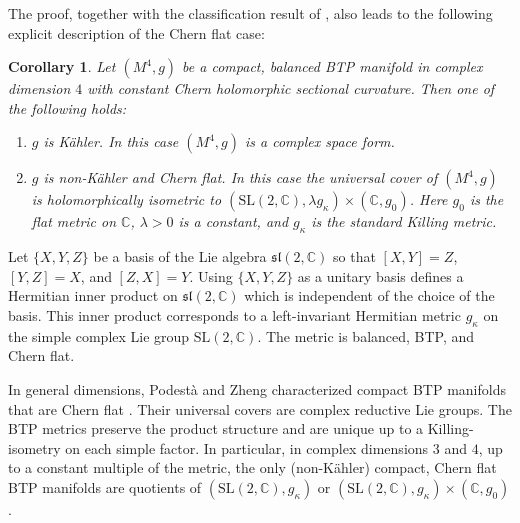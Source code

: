 \documentclass{amsart}
\newtheorem{corollary}[theorem]{Corollary}
\begin{document}
The proof, together with the classification result of \cite{ZhaoZ25}, also leads to the following explicit description of the Chern flat case:

\begin{corollary}
Let $(M^4,g)$ be a compact, balanced BTP manifold in complex dimension $4$ with constant Chern holomorphic sectional curvature. Then one of the following holds:
\begin{enumerate}
\item  $g$ is K\"ahler. In this case $(M^4,g)$ is a complex space form.
\item  $g$ is non-K\"ahler and Chern flat. In this case the universal cover of $(M^4,g)$ is holomorphically isometric to $(\mbox{SL}(2,{\mathbb C}), \lambda g_{\kappa}) \times ({\mathbb C},g_0)$. Here $g_0$ is the flat metric on ${\mathbb C}$, $\lambda >0$ is a constant, and $g_{\kappa}$ is the standard Killing metric.
    \end{enumerate}
\end{corollary}

Let $\{ X, Y, Z\}$ be a basis of the Lie algebra ${\mathfrak s}{\mathfrak l}(2,{\mathbb C})$ so that $[X,Y]=Z$, $[Y,Z]=X$, and $[Z,X]=Y$. Using $\{ X,Y,Z\}$ as a unitary basis defines a Hermitian inner product on ${\mathfrak s}{\mathfrak l}(2,{\mathbb C})$ which is independent of the choice of the basis. This inner product corresponds to a left-invariant Hermitian metric $g_{\kappa}$ on the simple complex Lie group $\mbox{SL}(2,{\mathbb C})$. The metric is balanced, BTP, and  Chern flat.

In general dimensions, Podest\`a and Zheng characterized compact BTP manifolds that are Chern flat \cite[Theorem 1.2, Theorem 3.4]{PodestaZ}. Their universal covers are complex reductive Lie groups. The BTP metrics preserve the product structure and are unique up to a Killing-isometry on each simple factor. In particular, in complex dimensions $3$ and $4$, up to a constant multiple of the metric, the only (non-K\"ahler) compact, Chern flat BTP manifolds are quotients of $(\mbox{SL}(2,{\mathbb C}), g_{\kappa})$ or $(\mbox{SL}(2,{\mathbb C}), g_{\kappa}) \times ({\mathbb C}, g_0)$.
\end{document}
